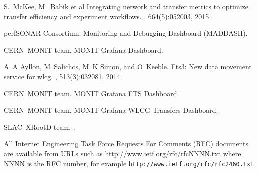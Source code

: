 \begin{thebibliography}{1}
S.~McKee, M.~Babik et al 
\newblock Integrating network and transfer metrics to optimize transfer
  efficiency and experiment workflows.
, 664(5):052003, 2015.

perfSONAR Consortium.
 {Monitoring and Debugging Dashboard (MADDASH)}.

CERN~{MONIT} team.
 {MONIT} {Grafana} {Dashboard}.

A~A Ayllon, M~Salichos, M~K Simon, and O~Keeble.
\newblock Fts3: New data movement service for wlcg.
, 513(3):032081, 2014.

CERN~{MONIT} team.
 {MONIT} {Grafana} {FTS} {Dashboard}.
 
CERN~{MONIT} team.
 {MONIT} {Grafana} {WLCG} {Transfers} {Dashboard}.


SLAC~{XRootD} team.
.

 All Internet Engineering Task Force Requests For Comments (RFC) documents are available
from URLs such as http://www.ietf.org/rfc/rfcNNNN.txt where NNNN is the RFC number, for example {\tt http://www.ietf.org/rfc/rfc2460.txt}

\end{thebibliography}